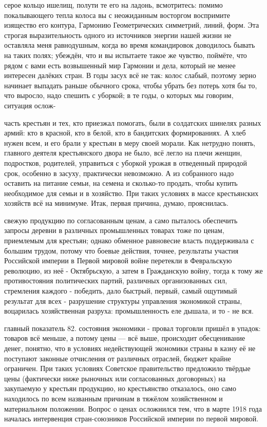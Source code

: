 серое кольцо ишелищ, полути те его на ладонь, всмотритесь: помимо покалывающего тепла колоса вы с неожиданным восторгом воспримите изящество его контура, Гармонию Геометрических симметрий, линий, форм. Эта строгая выразительность одного из источников энергии нашей жизни не оставляла меня равнодушным, когда во время командировок доводилось бывать на таких полях; убеждён, что и вы испытаете такое же чувство, поймёте, что рядом с вами есть возвышенный мир Гармонии и дела, который не менее интересен далёких стран. В годы засух всё не так: колос слабый, поэтому зерно начинает выпадать раньше обычного срока, чтобы убрать без потерь хотя бы то, что выросло, надо спешить с уборкой; в те годы, о которых мы говорим, ситуация ослож-

часть крестьян и тех, кто приезжал помогать, были в солдатских шинелях разных армий: кто в красной, кто в белой, кто в бандитских формированиях. А хлеб нужен всем, и его брали у крестьян в меру своей морали. Как нетрудно понять, главного деятеля крестьянского двора не было, всё легло на плечи женщин, подростков, родителей, управиться с уборкой урожая в отведенный природой срок, особенно в засуху, практически невозможно. А из собранного надо оставить на питание семьи, на семена и сколько-то продать, чтобы купить необходимое для семьи и в хозяйство. При таких условиях в массе крестьянских хозяйств всё на минимуме. Итак, первая причина, думаю, прояснилась.

свежую продукцию по согласованным ценам, а само пыталось обеспечить запросы деревни в различных промышленных товарах тоже по ценам, приемлемым для крестьян; однако обменное равновесие власть поддерживала с большим трудом, потому что боевые действия, точнее, результаты участия Российской империи в Первой мировой войне перетекли в Февральскую революцию, из неё - Октябрьскую, а затем в Гражданскую войну, тогда к тому же противостояния политических партий, различных организованных сил, стремления каждого - победить, дало быстрый, первый, самый ощутимый результат для всех - разрушение структуры управления экономикой страны, воцарилась хозяйственная разруха: промышленность еле дышала, и то - не вся.

главный показатель 82. состояния экономики - провал торговли пришёл в упадок: товаров всё меньше, а потому цены — всё выше, происходит обесценивание денег, понятно, что в условиях недействующей экономики страны в казну её не поступают законные отчисления от различных отраслей, бюджет крайне ограничен. При таких условиях Советское правительство предложило твёрдые цены (фактически ниже рыночных или согласованных договорных) на закупаемую у крестьян продукцию, но крестьянство отказалось, оно само находилось по всем названным причинам в тяжёлом хозяйственном и материальном положении. Вопрос о ценах осложнился тем, что в марте 1918 года началась интервенция стран-союзников Российской империи по первой мировой.

